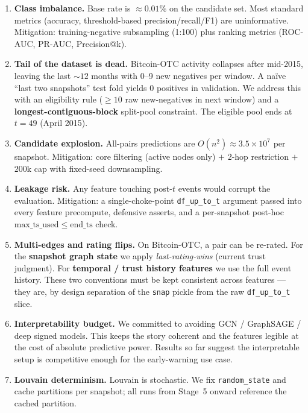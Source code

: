 \documentclass[11pt,a4paper]{article}
\newcommand{\code}[1]{\texttt{#1}}
\begin{document}
\begin{enumerate}[label=\arabic*.,leftmargin=*]
  \item \textbf{Class imbalance.} Base rate is $\approx 0.01\%$ on the
        candidate set. Most standard metrics (accuracy, threshold-based
        precision/recall/F1) are uninformative. Mitigation:
        training-negative subsampling (1:100) plus ranking metrics
        (ROC-AUC, PR-AUC, Precision@k).
  \item \textbf{Tail of the dataset is dead.} Bitcoin-OTC activity collapses
        after mid-2015, leaving the last ${\sim}12$ months with 0--9 new
        negatives per window. A na\"ive ``last two snapshots'' test fold
        yields 0 positives in validation. We address this with an
        eligibility rule ($\geq 10$ raw new-negatives in next window) and a
        \textbf{longest-contiguous-block} split-pool constraint. The
        eligible pool ends at $t = 49$ (April 2015).
  \item \textbf{Candidate explosion.} All-pairs predictions are
        $O(n^2) \approx 3.5 \times 10^7$ per snapshot. Mitigation: core
        filtering (active nodes only) $+$ 2-hop restriction $+$ $200\mathrm{k}$
        cap with fixed-seed downsampling.
  \item \textbf{Leakage risk.} Any feature touching post-$t$ events would
        corrupt the evaluation. Mitigation: a single-choke-point
        \code{df\_up\_to\_t} argument passed into every feature precompute,
        defensive asserts, and a per-snapshot post-hoc
        $\mathrm{max\_ts\_used} \leq \mathrm{end\_ts}$ check.
  \item \textbf{Multi-edges and rating flips.} On Bitcoin-OTC, a pair can be
        re-rated. For the \textbf{snapshot graph state} we apply
        \emph{last-rating-wins} (current trust judgment). For
        \textbf{temporal / trust history features} we use the full event
        history. These two conventions must be kept consistent across
        features --- they are, by design separation of the \code{snap}
        pickle from the raw \code{df\_up\_to\_t} slice.
  \item \textbf{Interpretability budget.} We committed to avoiding
        GCN / GraphSAGE / deep signed models. This keeps the story coherent
        and the features legible at the cost of absolute predictive power.
        Results so far suggest the interpretable setup is competitive enough
        for the early-warning use case.
  \item \textbf{Louvain determinism.} Louvain is stochastic. We fix
        \code{random\_state} and cache partitions per snapshot; all runs
        from Stage~5 onward reference the cached partition.
\end{enumerate}
\end{document}
